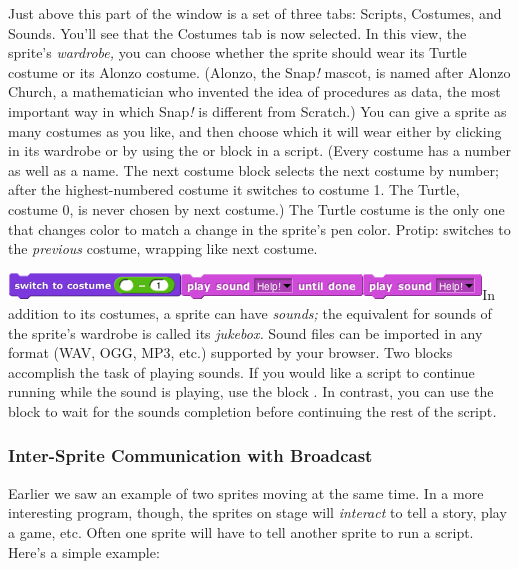 Just above this part of the window is a set of three tabs: Scripts,
Costumes, and Sounds. You'll see that the Costumes tab is now selected.
In this view, the sprite's \emph{wardrobe,} you can choose whether the
sprite should wear its Turtle costume or its Alonzo costume. (Alonzo,
the Snap\emph{!} mascot, is named after Alonzo Church, a mathematician
who invented the idea of procedures as data, the most important way in
which Snap\emph{!} is different from Scratch.) You can give a sprite as
many costumes as you like, and then choose which it will wear either by
clicking in its wardrobe or by using the or block in a script. (Every
costume has a number as well as a name. The next costume block selects
the next costume by number; after the highest-numbered costume it
switches to costume 1. The Turtle, costume 0, is never chosen by next
costume.) The Turtle costume is the only one that changes color to match
a change in the sprite's pen color. Protip: switches to the
\emph{previous} costume, wrapping like next costume.

\includegraphics[width=1.80556in,height=0.27778in]{media/image33.png}\includegraphics[width=1.89583in,height=0.26042in]{media/image38.png}\includegraphics[width=1.23958in,height=0.26042in]{media/image39.png}In
addition to its costumes, a sprite can have \emph{sounds;} the
equivalent for sounds of the sprite's wardrobe is called its
\emph{jukebox.} Sound files can be imported in any format (WAV, OGG,
MP3, etc.) supported by your browser. Two blocks accomplish the task of
playing sounds. If you would like a script to continue running while the
sound is playing, use the block . In contrast, you can use the block to
wait for the sound\textquotesingle s completion before continuing the
rest of the script\emph{.}

\subsubsection{Inter-Sprite Communication with
Broadcast}\label{inter-sprite-communication-with-broadcast}

Earlier we saw an example of two sprites moving at the same time. In a
more interesting program, though, the sprites on stage will
\emph{interact} to tell a story, play a game, etc. Often one sprite will
have to tell another sprite to run a script. Here's a simple example:

